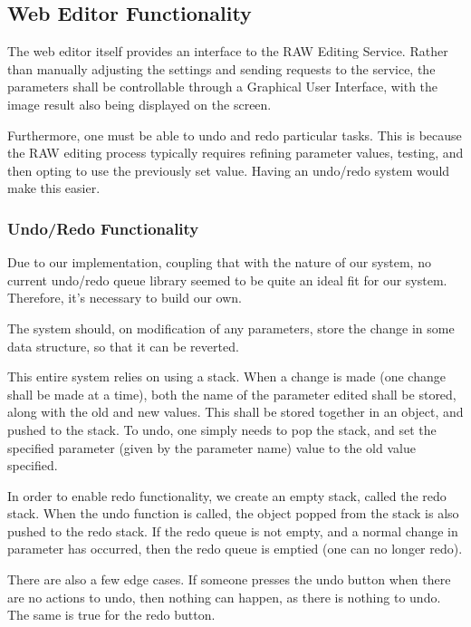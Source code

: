 \documentclass[11pt,a4paper]{article}
\begin{document}
\subsection{Web Editor Functionality}

The web editor itself provides an interface to the RAW Editing Service. Rather than
manually adjusting the settings and sending requests to the service, the parameters shall
be controllable through a Graphical User Interface, with the image result also being displayed
on the screen.

Furthermore, one must be able to undo and redo particular tasks. This is because the RAW editing
process typically requires refining parameter values, testing, and then opting to use the previously
set value. Having an undo/redo system would make this easier.

\subsubsection{Undo/Redo Functionality}
Due to our implementation, coupling that with the nature of our system, no current undo/redo queue library
seemed to be quite an ideal fit for our system. Therefore, it's necessary to build our own.

The system should, on modification of any parameters, store the change in some data structure,
so that it can be reverted.

This entire system relies on using a stack. When a change is made (one change shall be made at a time),
both the name of the parameter edited shall be stored, along with the old and new values. This shall be
stored together in an object, and pushed to the stack. To undo, one simply needs to pop the stack, and
set the specified parameter (given by the parameter name) value to the old value specified. 

In order to enable redo functionality, we create an empty stack, called the redo stack. When the undo function is called,
the object popped from the stack is also pushed to the redo stack. If the redo queue is not empty, and a normal change in parameter
has occurred, then the redo queue is emptied (one can no longer redo).

There are also a few edge cases. If someone presses the undo button when there are no actions to undo, then nothing can happen,
as there is nothing to undo. The same is true for the redo button.
\end{document}
